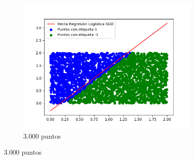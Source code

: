 \documentclass[12pt,a4paper]{article}
\begin{document}
\begin{figure}[H]
\begin{subfigure}{0.33\textwidth}
		\includegraphics[scale=0.37]{./Imagenes/ej2-27.png}
		\caption{3.000 puntos}
	\end{subfigure}
\end{figure}
\end{document}

